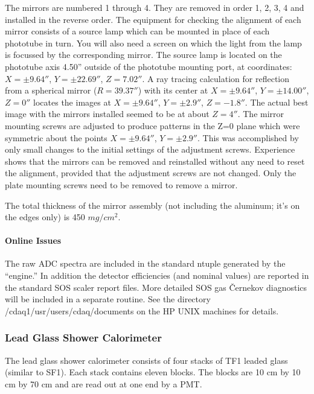 	The mirrors are numbered 1 through 4.  They are removed in
order 1, 2, 3, 4 and installed in the reverse order.  The equipment
for checking the alignment of each mirror consists of a source lamp
which can be mounted in place of each phototube in turn.  You will
also need a screen on which the light from the lamp is focussed by the
corresponding mirror.  The source lamp is located on the phototube
axis 4.50'' outside of the phototube mounting port, at coordinates:
$X = \pm9.64''$, $Y = \pm22.69''$, $Z = 7.02''$.  A ray tracing
calculation for reflection from a spherical mirror ($R = 39.37''$)
with its center at $X = \pm9.64''$, $Y = \pm14.00''$, $Z = 0''$
locates the images at $X = \pm9.64''$, $Y = \pm2.9''$, $Z = -1.8''$.
The actual best image with the mirrors installed seemed to be at about
$Z = 4''$.  The mirror mounting screws are adjusted to produce
patterns in the Z=0 plane which were symmetric about the points $X =
\pm9.64''$, $Y = \pm2.9''$.  This was accomplished by only small
changes to the initial settings of the adjustment screws.  Experience
shows that the mirrors can be removed and reinstalled without any need
to reset the alignment, provided that the adjustment screws are not
changed.  Only the plate mounting screws need to be removed to remove
a mirror.

	The total thickness of the mirror assembly (not including the
aluminum; it's on the edges only) is 450 $mg/cm^{2}$.

\paragraph{Online Issues}

	The raw ADC spectra are included in the standard ntuple
generated by the ``engine.''  In addition the detector efficiencies
(and nominal values) are reported in the standard SOS scaler report
files.  More detailed SOS gas \v{C}ernekov diagnostics will be
included in a separate routine.  See the directory
/cdaq1/usr/users/cdaq/documents on the HP UNIX machines for details.


\subsubsection{Lead Glass Shower Calorimeter }

The lead glass shower calorimeter consists of four stacks of
TF1 leaded glass (similar to SF1). Each stack contains eleven
blocks. The blocks are 10 cm by 10 cm by 70 cm and are read
out at one end by a PMT.

